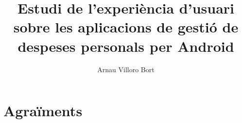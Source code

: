 \documentclass{book}
\title{Estudi de l'experiència d'usuari sobre les aplicacions de gestió de despeses personals per Android}
\author{Arnau Villoro Bort}
\begin{document}
\newcommand{\blueA}{\cellcolor{blue_table_1}}
\newcommand{\blueB}{\cellcolor{blue_table_2}}
\newcommand{\blueC}{\cellcolor{blue_table_3}}
\newcommand{\headA}[1]{\multicolumn{1}{|c|}{\blueA \textbf{#1}}}
\newcommand{\headB}[1]{\multicolumn{1}{|c|}{\blueB \textbf{#1}}}
\newcommand{\headC}[1]{\multicolumn{1}{|c|}{\blueC \textbf{#1}}}
\newcommand{\noBorde}[1]{\multicolumn{1}{#1}{}}


\frontmatter






\tableofcontents





\mainmatter















\chapter{Agraïments}


\end{document}
